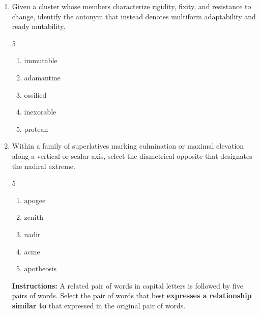 \documentclass[12pt]{article}
\begin{document}
\begin{enumerate}[label=\textbf{\arabic*.}]
\begin{multicols}{5}
\begin{enumerate}[label=(\Alph*)]
\end{enumerate}

\end{multicols}

\item Given a cluster whose members characterize rigidity, fixity, and resistance to change, identify the antonym that instead denotes multiform adaptability and ready mutability.

\begin{multicols}{5}

\begin{enumerate}[label=(\Alph*)]

\item immutable

\item adamantine

\item ossified

\item inexorable

\item protean

\end{enumerate}

\end{multicols}

\item Within a family of superlatives marking culmination or maximal elevation along a vertical or scalar axis, select the diametrical opposite that designates the nadiral extreme.

\begin{multicols}{5}

\begin{enumerate}[label=(\Alph*)]

\item apogee

\item zenith

\item nadir

\item acme

\item apotheosis

\end{enumerate}

\end{multicols}
\noindent\textbf{Instructions:} A related pair of words in capital letters is followed by five pairs of words. Select the pair of words that best \textbf{expresses a relationship similar to} that expressed in the original pair of words.


\end{enumerate}
\end{document}
